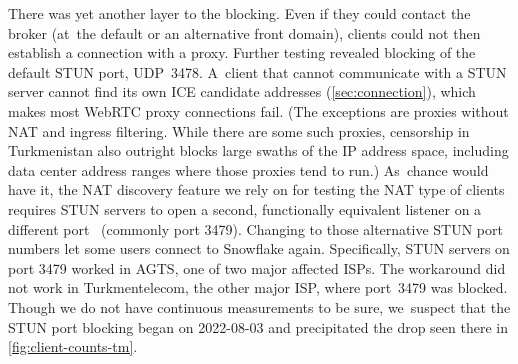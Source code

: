 \documentclass[letterpaper,twocolumn]{article}
\begin{document}
There was yet another layer to the blocking.
Even if they could contact the broker
(at~the default or an alternative front domain),
clients could not then establish a connection with a proxy.
Further testing revealed blocking of the default STUN port, UDP~3478.
A~client that cannot communicate with a STUN server
cannot find its own ICE candidate addresses (\autoref{sec:connection}),
which makes most WebRTC proxy connections fail.
(The exceptions are proxies without NAT and ingress filtering.
While there are some such proxies,
censorship in Turkmenistan also outright blocks
large swaths of the IP address space,
including data center address ranges where those proxies tend to run.)
As~chance would have it, the NAT discovery feature we rely on
for testing the NAT type of clients requires
STUN servers to open a second, functionally equivalent listener
on a different port~\cite[\S 6]{rfc5780} (commonly port 3479).
Changing to those alternative STUN port numbers
let some users connect to Snowflake again.
Specifically, STUN servers on port 3479 worked in AGTS,
one of two major affected ISPs.
The workaround did not work in Turkmentelecom, the other major ISP,
where port~3479 was blocked.
Though we do not have continuous measurements to be sure,
we~suspect that the STUN port blocking began on \mbox{2022-08-03}
and precipitated the drop seen there in \autoref{fig:client-counts-tm}.
\end{document}
